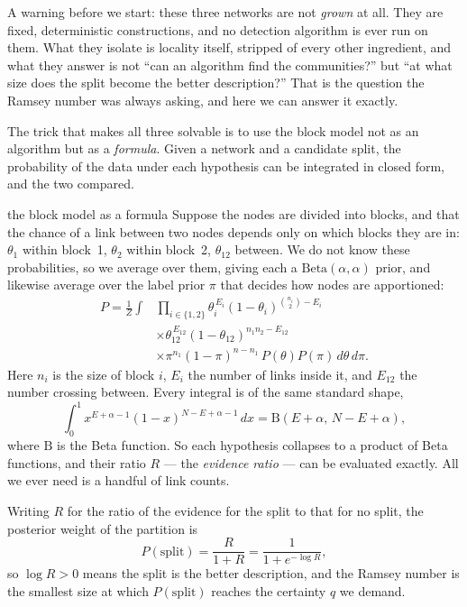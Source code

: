 A warning before we start: these three networks are not \emph{grown} at all. They
are fixed, deterministic constructions, and no detection algorithm is ever run on
them. What they isolate is locality itself, stripped of every other ingredient,
and what they answer is not ``can an algorithm find the communities?'' but ``at
what size does the split become the better description?'' That is the question the
Ramsey number was always asking, and here we can answer it exactly.

The trick that makes all three solvable is to use the block model not as an
algorithm but as a \emph{formula}. Given a network and a candidate split, the
probability of the data under each hypothesis can be integrated in closed form,
and the two compared.

\begin{calculation}{the block model as a formula}
Suppose the nodes are divided into blocks, and that the chance of a link between
two nodes depends only on which blocks they are in: $\theta_1$ within block~1,
$\theta_2$ within block~2, $\theta_{12}$ between. We do not know these
probabilities, so we average over them, giving each a $\mathrm{Beta}(\alpha,\alpha)$
prior, and likewise average over the label prior $\pi$ that decides how nodes are
apportioned:
\begin{equation}
\begin{split}
  P = \frac{1}{Z}\int
  &\prod_{i\in\{1,2\}}\theta_i^{\,E_i}(1-\theta_i)^{\binom{n_i}{2}-E_i}\\
  &\times\theta_{12}^{\,E_{12}}(1-\theta_{12})^{n_1n_2-E_{12}}\\
  &\times\pi^{n_1}(1-\pi)^{n-n_1}\,P(\theta)P(\pi)\,d\theta\,d\pi .
\end{split}
\label{eq:com-model}
\end{equation}
Here $n_i$ is the size of block $i$, $E_i$ the number of links inside it, and
$E_{12}$ the number crossing between. Every integral is of the same standard shape,
\begin{equation}
  \int_0^1 x^{E+\alpha-1}(1-x)^{N-E+\alpha-1}\,dx
  = \mathrm{B}(E{+}\alpha,\,N{-}E{+}\alpha),
  \label{eq:com-betaint}
\end{equation}
where $\mathrm{B}$ is the Beta function. So each hypothesis collapses to a product
of Beta functions, and their ratio $R$ --- the \emph{evidence ratio} --- can be
evaluated exactly. All we ever need is a handful of link counts.
\end{calculation}

Writing $R$ for the ratio of the evidence for the split to that for no split, the
posterior weight of the partition is
\begin{equation}
  P(\mathrm{split}) = \frac{R}{1+R} = \frac{1}{1+e^{-\log R}},
  \label{eq:com-psplit}
\end{equation}
so $\log R>0$ means the split is the better description, and the Ramsey number is
the smallest size at which $P(\mathrm{split})$ reaches the certainty $q$ we demand.

